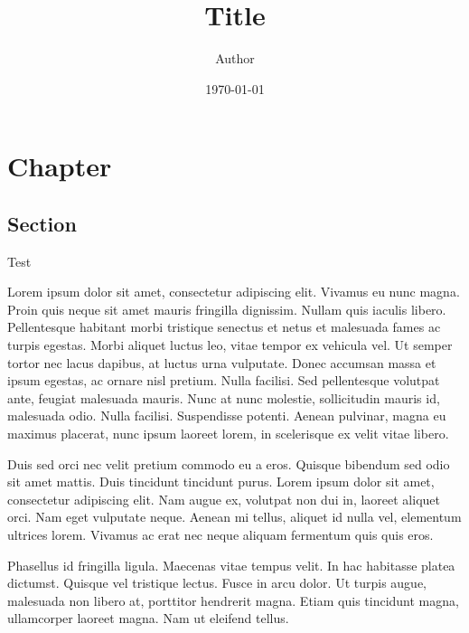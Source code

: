 \documentclass[
twoside,
a4paper,
10pt,
english,
notikzsans,
final,
]{dpse}
\title{Title}
\subtitle{}
\author{Author}
\date{\today}
\begin{document}
\frontmatter

\maketitle

\clearpage
\tableofcontents
\listoffigures
\listoftables
\let\LaTeXStandardClearpage\clearpage
\let\clearpage\relax
\listoflistings
\let\clearpage\LaTeXStandardClearpage
\listoftheorems[onlynamed]

\printunsrtglossary[type=symbols]

\mainmatter


\chapter{Chapter}


\section{Section}

Test

Lorem ipsum dolor sit amet, consectetur adipiscing elit. Vivamus eu nunc magna. Proin quis neque sit amet mauris fringilla dignissim. Nullam quis iaculis libero. Pellentesque habitant morbi tristique senectus et netus et malesuada fames ac turpis egestas. Morbi aliquet luctus leo, vitae tempor ex vehicula vel. Ut semper tortor nec lacus dapibus, at luctus urna vulputate. Donec accumsan massa et ipsum egestas, ac ornare nisl pretium. Nulla facilisi. Sed pellentesque volutpat ante, feugiat malesuada mauris. Nunc at nunc molestie, sollicitudin mauris id, malesuada odio. Nulla facilisi. Suspendisse potenti. Aenean pulvinar, magna eu maximus placerat, nunc ipsum laoreet lorem, in scelerisque ex velit vitae libero.

Duis sed orci nec velit pretium commodo eu a eros. Quisque bibendum sed odio sit amet mattis. Duis tincidunt tincidunt purus. Lorem ipsum dolor sit amet, consectetur adipiscing elit. Nam augue ex, volutpat non dui in, laoreet aliquet orci. Nam eget vulputate neque. Aenean mi tellus, aliquet id nulla vel, elementum ultrices lorem. Vivamus ac erat nec neque aliquam fermentum quis quis eros.

Phasellus id fringilla ligula. Maecenas vitae tempus velit. In hac habitasse platea dictumst. Quisque vel tristique lectus. Fusce in arcu dolor. Ut turpis augue, malesuada non libero at, porttitor hendrerit magna. Etiam quis tincidunt magna, ullamcorper laoreet magna. Nam ut eleifend tellus.
\end{document}
